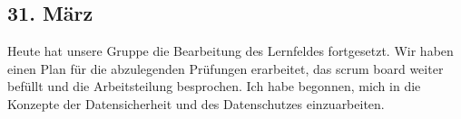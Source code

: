 \subsection{31. März}
Heute hat unsere Gruppe die Bearbeitung des Lernfeldes fortgesetzt. Wir haben einen Plan für die abzulegenden Prüfungen erarbeitet, das scrum board weiter befüllt und die Arbeitsteilung besprochen. Ich habe begonnen, mich in die Konzepte der Datensicherheit und des Datenschutzes einzuarbeiten.